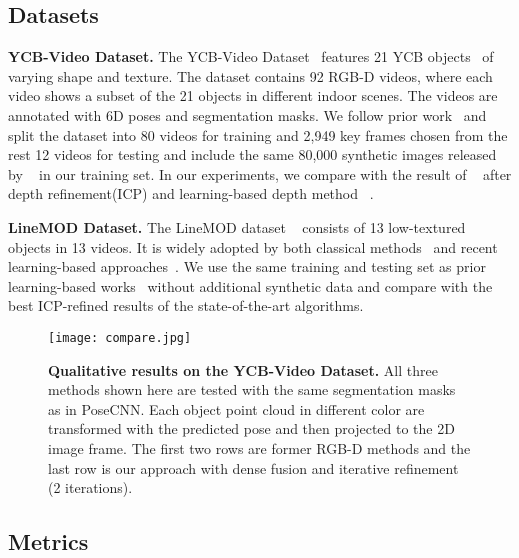 \documentclass[10pt,twocolumn,letterpaper]{article}
\begin{document}
\subsection{Datasets}
\label{ssec:dsm}

\noindent\textbf{YCB-Video Dataset.} The YCB-Video Dataset~\citet{xiang2017posecnn} features 21 YCB objects~\citet{alli2015TheYO} of varying shape and texture. The dataset contains 92 RGB-D videos, where each video shows a subset of the 21 objects in different indoor scenes. The videos are annotated with 6D poses and segmentation masks. We follow prior work~\cite{xiang2017posecnn} and split the dataset into 80 videos for training and 2,949 key frames chosen from the rest 12 videos for testing and include the same 80,000 synthetic images released by ~\cite{xiang2017posecnn} in our training set. In our experiments, we compare with the result of ~\cite{xiang2017posecnn} after depth refinement(ICP) and learning-based depth method ~\cite{xu2017pointfusion}.

\noindent\textbf{LineMOD Dataset.}
The LineMOD dataset ~\citet{Hinterstoier2011MultimodalTF} consists of 13 low-textured objects in 13 videos. It is widely adopted by both classical methods~\cite{vidal20186d, drost2010model, buch2017rotational} and recent learning-based approaches~\cite{sundermeyer2018implicit, tekin18, li2018deepim}. We use the same training and testing set as prior learning-based works~\cite{rad2017bb8, tekin18, li2018deepim} without additional synthetic data and compare with the best ICP-refined results of the state-of-the-art algorithms.

\begin{figure*}[ht]
	\centering
	\texttt{[image: compare.jpg]}
	\caption{\textbf{Qualitative results on the YCB-Video Dataset.} All three methods shown here are tested with the same segmentation masks as in PoseCNN. Each object point cloud in different color are transformed with the predicted pose and then projected to the 2D image frame. The first two rows are former RGB-D methods and the last row is our approach with dense fusion and iterative refinement (2 iterations).}
	\label{exp:qualitative_ycb}
\end{figure*}

\subsection{Metrics}
\label{ssec:met}
\end{document}
